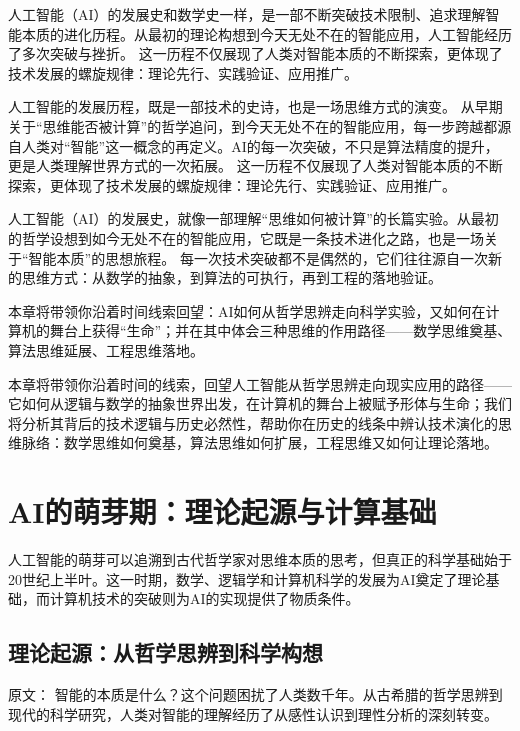 
人工智能（AI）的发展史和数学史一样，是一部不断突破技术限制、追求理解智能本质的进化历程。从最初的理论构想到今天无处不在的智能应用，人工智能经历了多次突破与挫折。 这一历程不仅展现了人类对智能本质的不断探索，更体现了技术发展的螺旋规律：理论先行、实践验证、应用推广。

人工智能的发展历程，既是一部技术的史诗，也是一场思维方式的演变。  
从早期关于“思维能否被计算”的哲学追问，到今天无处不在的智能应用，每一步跨越都源自人类对“智能”这一概念的再定义。AI的每一次突破，不只是算法精度的提升，更是人类理解世界方式的一次拓展。 
 这一历程不仅展现了人类对智能本质的不断探索，更体现了技术发展的螺旋规律：理论先行、实践验证、应用推广。 
 
 人工智能（AI）的发展史，就像一部理解“思维如何被计算”的长篇实验。从最初的哲学设想到如今无处不在的智能应用，它既是一条技术进化之路，也是一场关于“智能本质”的思想旅程。  
每一次技术突破都不是偶然的，它们往往源自一次新的思维方式：从数学的抽象，到算法的可执行，再到工程的落地验证。  

本章将带领你沿着时间线索回望：AI如何从哲学思辨走向科学实验，又如何在计算机的舞台上获得“生命”；并在其中体会三种思维的作用路径——数学思维奠基、算法思维延展、工程思维落地。



本章将带领你沿着时间的线索，回望人工智能从哲学思辨走向现实应用的路径——它如何从逻辑与数学的抽象世界出发，在计算机的舞台上被赋予形体与生命；我们将分析其背后的技术逻辑与历史必然性，帮助你在历史的线条中辨认技术演化的思维脉络：数学思维如何奠基，算法思维如何扩展，工程思维又如何让理论落地。

\section{AI的萌芽期：理论起源与计算基础}

人工智能的萌芽可以追溯到古代哲学家对思维本质的思考，但真正的科学基础始于20世纪上半叶。这一时期，数学、逻辑学和计算机科学的发展为AI奠定了理论基础，而计算机技术的突破则为AI的实现提供了物质条件。

\subsection{理论起源：从哲学思辨到科学构想}

原文：
智能的本质是什么？这个问题困扰了人类数千年。从古希腊的哲学思辨到现代的科学研究，人类对智能的理解经历了从感性认识到理性分析的深刻转变。

